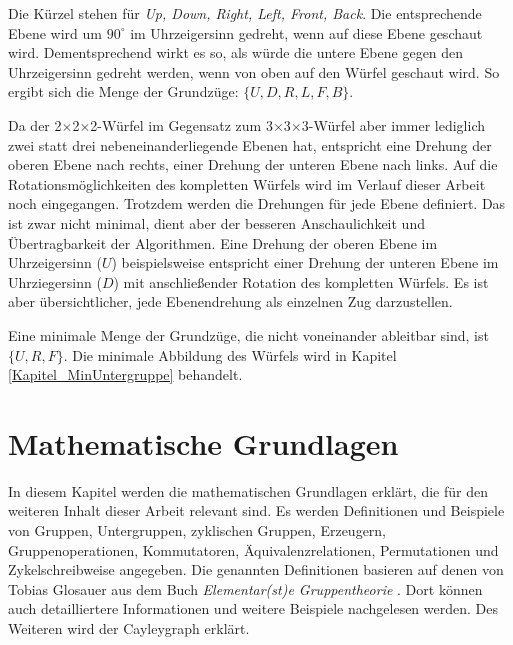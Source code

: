 \documentclass[12pt,a4paper, usenames, dvipsnames]{article}
\theoremstyle{mystyle}
\theoremstyle{definition}
\newcommand{\Ttwo}{2$\times$2$\times$2-}
\newcommand{\Tthree}{3$\times$3$\times$3-}
\begin{document}
Die Kürzel stehen für \textit{Up, Down, Right, Left, Front, Back}. 
Die entsprechende Ebene wird um $90^\circ$ im Uhrzeigersinn gedreht, wenn auf diese Ebene geschaut wird. Dementsprechend wirkt es so, als würde die untere Ebene gegen den Uhrzeigersinn gedreht werden, wenn von oben auf den Würfel geschaut wird. So ergibt sich die Menge der Grundzüge: $\{U, D, R, L, F, B\}$.


Da der \Ttwo Würfel im Gegensatz zum \Tthree Würfel aber immer lediglich zwei statt drei nebeneinanderliegende Ebenen hat, entspricht eine Drehung der oberen Ebene nach rechts, einer Drehung der unteren Ebene nach links. 
Auf die Rotationsmöglichkeiten des kompletten Würfels wird im Verlauf dieser Arbeit noch eingegangen. Trotzdem werden die Drehungen für jede Ebene definiert. Das ist zwar nicht minimal, dient aber der besseren Anschaulichkeit und Übertragbarkeit der Algorithmen.
Eine Drehung der oberen Ebene im Uhrzeigersinn ($U$) beispielsweise entspricht einer Drehung der unteren Ebene im Uhrziegersinn ($D$) mit anschließender Rotation des kompletten Würfels. Es ist aber übersichtlicher, jede Ebenendrehung als einzelnen Zug darzustellen. 

Eine minimale Menge der Grundzüge, die nicht voneinander ableitbar sind, ist $\{U, R, F\}$. Die minimale Abbildung des Würfels wird in Kapitel \ref{Kapitel_MinUntergruppe} behandelt.



%
%
%
%
%
%
%
%
%
%
%
%
%
%
%
%
%


\newpage
\section{Mathematische Grundlagen}

\label{Kapitel_MathematischeGrundlagen}

In diesem Kapitel werden die mathematischen Grundlagen erklärt, die für den weiteren Inhalt dieser Arbeit relevant sind. Es werden Definitionen und Beispiele von Gruppen, Untergruppen, zyklischen Gruppen, Erzeugern, Gruppenoperationen, Kommutatoren, Äquivalenzrelationen, Permutationen und Zykelschreibweise angegeben.
Die genannten Definitionen basieren auf denen von Tobias Glosauer aus dem Buch \textit{Elementar(st)e Gruppentheorie} \cite{Buch}. Dort können auch detailliertere Informationen und weitere Beispiele nachgelesen werden.
Des Weiteren wird der Cayleygraph erklärt. 
%
%
%
%
%
%
\end{document}
